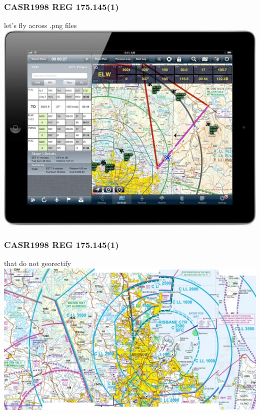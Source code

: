 \begin{frame}
\frametitle{CASR1998 REG 175.145(1)}
\begin{block}{let's fly across .png files}
\includegraphics[height=0.5\textheight]{image/avplan-screenshot.jpg}
\end{block}
\end{frame}

\begin{frame}
\frametitle{CASR1998 REG 175.145(1)}
\begin{block}{that do not georectify}
\includegraphics[height=0.5\textheight]{image/vtc-georectification.png}
\end{block}
\end{frame}

